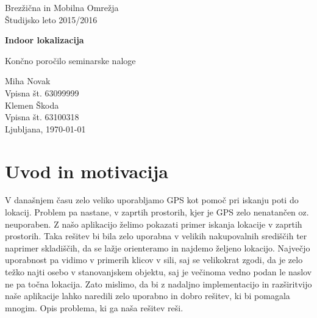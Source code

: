 \documentclass[11pt,a4paper,slovene]{article}
\begin{document}
\label{naslov}
\thispagestyle{empty}

\begin{center}
\begin{Large}
Brez\v{z}i\v{c}na in Mobilna Omre\v{z}ja\\
Študijsko leto 2015/2016\\
\end{Large}

\vspace*{4cm}
\begin{LARGE}
\textbf{Indoor lokalizacija\\}
\end{LARGE}
\vspace*{0.5cm}

\begin{Large}
Končno poročilo seminarske naloge\\

\vspace*{4cm}

Miha Novak\\
Vpisna št. 63099999\\
Klemen Škoda\\
Vpisna št. 63100318\\

\vspace*{5cm}
Ljubljana, \today
\end{Large}
\end{center}

\pagebreak
\setcounter{page}{1}


\label{Kazalo}
\tableofcontents
\thispagestyle{empty}
\pagebreak

\section{Uvod in motivacija}
V današnjem času zelo veliko uporabljamo GPS kot pomoč pri iskanju poti do lokacij. Problem pa nastane, v zaprtih prostorih, kjer je GPS zelo nenatančen oz. neuporaben.
Z našo aplikacijo želimo pokazati primer iskanja lokacije v zaprtih prostorih. Taka rešitev bi bila zelo uporabna v velikih nakupovalnih središčih ter naprimer skladiščih, da se lažje orienteramo in najdemo željeno lokacijo. Največjo uporabnost pa vidimo v primerih klicov v sili, saj se velikokrat zgodi, da je zelo težko najti osebo v stanovanjskem objektu, saj je večinoma vedno podan le naslov ne pa točna lokacija. Zato mislimo, da bi z nadaljno implementacijo in razširitvijo naše aplikacije lahko naredili zelo uporabno in dobro rešitev, ki bi pomagala mnogim.
Opis problema, ki ga naša rešitev reši.
\end{document}
